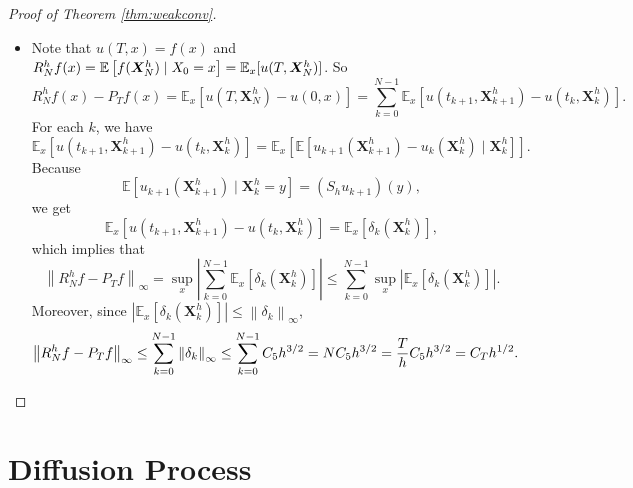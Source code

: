 \begin{proof}[Proof of Theorem \ref{thm:weakconv}]
\begin{itemize}
        \item Note that $u(T,x) = f(x)$ and $R^h_Nf(x) = \mathbb{E}\left[f(\bm{X}^h_N) \mid X_0 = x\right] = \mathbb{E}_x[u(T,\bm{X}^h_N)]$. So
        \begin{equation*}
            R_N^h f(x)-P_T f(x)=\mathbb{E}_x\left[u\left(T, \bm{X}_N^h\right)-u(0, x)\right]=\sum_{k=0}^{N-1} \mathbb{E}_x\left[u\left(t_{k+1}, \bm{X}_{k+1}^h\right)-u\left(t_k, \bm{X}_k^h\right)\right] .
        \end{equation*}
        For each $k$, we have
        \begin{equation*}
            \mathbb{E}_x\left[u\left(t_{k+1}, \bm{X}_{k+1}^h\right)-u\left(t_k, \bm{X}_k^h\right)\right]=\mathbb{E}_x\left[\mathbb{E}\left[u_{k+1}\left(\bm{X}_{k+1}^h\right)-u_k\left(\bm{X}_k^h\right) \mid \bm{X}_k^h\right]\right].
        \end{equation*}
        Because 
        \begin{equation*}
            \mathbb{E}\left[u_{k+1}\left(\bm{X}_{k+1}^h\right) \mid \bm{X}_k^h=y\right]=\left(S_h u_{k+1}\right)(y),
        \end{equation*}
        we get
        \begin{equation*}
            \mathbb{E}_x\left[u\left(t_{k+1}, \bm{X}_{k+1}^h\right)-u\left(t_k, \bm{X}_k^h\right)\right]=\mathbb{E}_x\left[\delta_k\left(\bm{X}_k^h\right)\right],
        \end{equation*}
        which implies that
        \begin{equation*}
            \left\|R_N^h f-P_T f\right\|_{\infty}=\sup _x\left|\sum_{k=0}^{N-1} \mathbb{E}_x\left[\delta_k\left(\bm{X}_k^h\right)\right]\right| \leq \sum_{k=0}^{N-1} \sup _x\left|\mathbb{E}_x\left[\delta_k\left(\bm{X}_k^h\right)\right]\right| .
        \end{equation*}
        Moreover, since $\left|\mathbb{E}_x\left[\delta_k\left(\bm{X}_k^h\right)\right]\right| \leq\left\|\delta_k\right\|_{\infty}$,
        \begin{equation*}
            \left\|R_N^h f-P_T f\right\|_{\infty} \leq \sum_{k=0}^{N-1}\left\|\delta_k\right\|_{\infty} \leq \sum_{k=0}^{N-1} C_5 h^{3 / 2}=N C_5 h^{3 / 2}=\frac{T}{h} C_5 h^{3 / 2}=C_T h^{1 / 2} . \qedhere
        \end{equation*}
    \end{itemize}
\end{proof}

\section{Diffusion Process}

